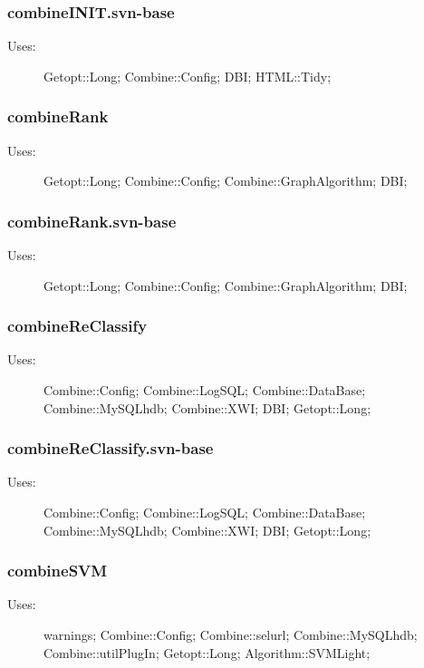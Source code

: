 \subsubsection{combineINIT.svn-base}
\begin{description}
\item[Uses:] Getopt::Long; Combine::Config; DBI; HTML::Tidy; 

\end{description}
\subsubsection{combineRank}
\begin{description}
\item[Uses:] Getopt::Long; Combine::Config; Combine::GraphAlgorithm; DBI; 

\end{description}
\subsubsection{combineRank.svn-base}
\begin{description}
\item[Uses:] Getopt::Long; Combine::Config; Combine::GraphAlgorithm; DBI; 

\end{description}
\subsubsection{combineReClassify}
\begin{description}
\item[Uses:] Combine::Config; Combine::LogSQL; Combine::DataBase; Combine::MySQLhdb; Combine::XWI; DBI; Getopt::Long; 

\end{description}
\subsubsection{combineReClassify.svn-base}
\begin{description}
\item[Uses:] Combine::Config; Combine::LogSQL; Combine::DataBase; Combine::MySQLhdb; Combine::XWI; DBI; Getopt::Long; 

\end{description}
\subsubsection{combineSVM}
\begin{description}
\item[Uses:] warnings; Combine::Config; Combine::selurl; Combine::MySQLhdb; Combine::utilPlugIn; Getopt::Long; Algorithm::SVMLight; 

\end{description}
